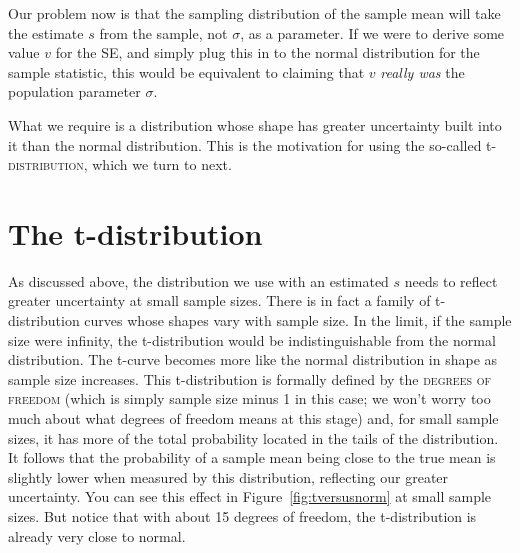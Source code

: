 \documentclass[12pt]{book}\usepackage[]{graphicx}\usepackage[]{color}
\begin{document}
Our problem now is that 
the sampling distribution of the sample mean will take the estimate $s$ from the sample, not $\sigma$, as a parameter.
If we were to derive some value $v$ for the SE, and simply plug this in to the normal distribution for the sample statistic, this would be equivalent to claiming that $v$ \emph{really was} the population parameter $\sigma$.

What we require is a distribution whose shape has greater uncertainty built into it than
the normal distribution. This is the motivation for using the so-called
t-\textsc{distribution}, which we turn to next.

\section{The t-distribution}

As discussed above, the distribution we use with an estimated $s$ needs to reflect greater uncertainty at small sample sizes. There is in fact a family of t-distribution curves whose shapes vary with sample size. In the limit, if the sample size were infinity, the t-distribution would be indistinguishable from the normal distribution. The t-curve becomes more like the normal distribution in shape as sample size increases.
This t-distribution is formally defined by the \textsc{degrees of freedom} (which is simply sample size
minus 1 in this case; we won't worry too much about what degrees of freedom means at this stage) and, for small sample sizes, it has more of the total probability located in
the tails of the distribution. It follows that the probability of a sample mean being close to the true mean is slightly lower when measured by this distribution, reflecting our
greater uncertainty. You can see this effect in Figure~\ref{fig:tversusnorm} at small sample sizes. But notice
that with about 15 degrees of freedom, the t-distribution is
already very close to normal.
\end{document}
